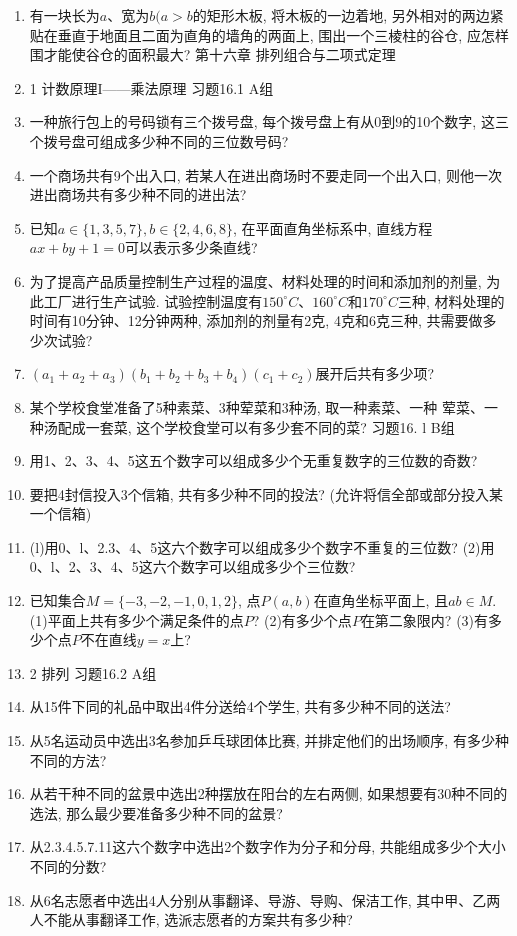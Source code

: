 \documentclass[10pt,a4paper]{article}
\begin{document}
\begin{enumerate}[1.]
\item 有一块长为$a$、宽为$b(a>b$的矩形木板, 将木板的一边着地, 另外相对的两边紧贴在垂直于地面且二面为直角的墙角的两面上, 围出一个三棱柱的谷仓, 应怎样围才能使谷仓的面积最大?
第十六章  排列组合与二项式定理
\item 1  计数原理I——乘法原理
习题16.1  A组
\item 一种旅行包上的号码锁有三个拨号盘, 每个拨号盘上有从0到9的10个数字, 这三个拨号盘可组成多少种不同的三位数号码?
\item 一个商场共有9个出入口, 若某人在进出商场时不要走同一个出入口, 则他一次进出商场共有多少种不同的进出法?
\item 已知$a\in \{1,3,5,7\},b\in \{2,4,6,8\}$, 在平面直角坐标系中, 直线方程$ax+by+1=0$可以表示多少条直线?
\item 为了提高产品质量控制生产过程的温度、材料处理的时间和添加剂的剂量, 为此工厂进行生产试验. 试验控制温度有$150^\circ C$、$160^\circ C$和$170^\circ C$三种, 材料处理的时间有10分钟、12分钟两种, 添加剂的剂量有2克, 4克和6克三种, 共需要做多少次试验?
\item $(a_1+a_2+a_3)(b_1+b_2+b_3+b_4)(c_1+c_2)$展开后共有多少项?
\item 某个学校食堂准备了5种素菜、3种荤菜和3种汤, 取一种素菜、一种
荤菜、一种汤配成一套菜, 这个学校食堂可以有多少套不同的菜?
习题16. l B组
\item 用1、2、3、4、5这五个数字可以组成多少个无重复数字的三位数的奇数?
\item 要把4封信投入3个信箱, 共有多少种不同的投法? (允许将信全部或部分投入某一个信箱)
\item (l)用0、l、2.3、4、5这六个数字可以组成多少个数字不重复的三位数?
(2)用0、l、2、3、4、5这六个数字可以组成多少个三位数?
\item 已知集合$M=\{-3,-2,-1,0,1,2\}$, 点$P(a,b)$在直角坐标平面上, 且$ab\in M$.
(1)平面上共有多少个满足条件的点$P$?
(2)有多少个点$P$在第二象限内?
(3)有多少个点$P$不在直线$y=x$上?
\item 2   排列
习题16.2  A组
\item 从15件下同的礼品中取出4件分送给4个学生, 共有多少种不同的送法?
\item 从5名运动员中选出3名参加乒乓球团体比赛, 并排定他们的出场顺序, 有多少种不同的方法?
\item 从若干种不同的盆景中选出2种摆放在阳台的左右两侧, 如果想要有30种不同的选法, 那么最少要准备多少种不同的盆景?
\item 从2.3.4.5.7.11这六个数字中选出2个数字作为分子和分母, 共能组成多少个大小不同的分数?
\item 从6名志愿者中选出4人分别从事翻译、导游、导购、保洁工作, 其中甲、乙两人不能从事翻译工作, 选派志愿者的方案共有多少种?

\end{enumerate}
\end{document}
